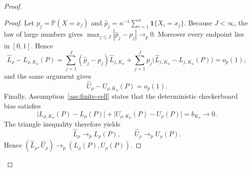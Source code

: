 \documentclass[11pt]{article}
\renewcommand{\Pr}{\mathbb{P}}
\newcommand{\one}{\mathbf{1}}
\theoremstyle{definition}
\theoremstyle{plain}
\theoremstyle{remark}
\begin{document}
\begin{proof}
\begin{proof}
Let \(p_j=\Pr(X=x_j)\) and \(\widehat p_j=n^{-1}\sum_{i=1}^n\one\{X_i=x_j\}\).  Because \(J<\infty\), the law of large numbers gives \(\max_{j\le J}|\widehat p_j-p_j|\to_p0\).  Moreover every endpoint lies in \([0,1]\).  Hence
\[
\widehat L_\rho-L_{\rho,K_n}(P)
=\sum_{j=1}^J(\widehat p_j-p_j)\widehat L_{j,K_n}+\sum_{j=1}^J p_j\bigl(\widehat L_{j,K_n}-L_{j,K_n}(P)\bigr)=o_p(1),
\]
and the same argument gives
\[
\widehat U_\rho-U_{\rho,K_n}(P)=o_p(1).
\]
Finally, Assumption~\ref{ass:finite-cell} states that the deterministic checkerboard bias satisfies
\[
\bigl|L_{\rho,K_n}(P)-L_\rho(P)\bigr|+\bigl|U_{\rho,K_n}(P)-U_\rho(P)\bigr|=b_{K_n}\to0.
\]
The triangle inequality therefore yields
\[
\widehat L_\rho\to_p L_\rho(P),
\qquad
\widehat U_\rho\to_p U_\rho(P).
\]
Hence \((\widehat L_\rho,\widehat U_\rho)\to_p(L_\rho(P),U_\rho(P))\).
\end{proof}
\end{proof}
\end{document}

